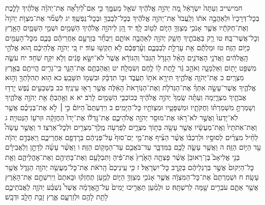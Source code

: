 \documentclass[twoside, openany, parskip=half, 11pt]{book}
\begin{document}
חמישייב וְעַתָּה֙ יִשְׂרָאֵ֔ל מָ֚ה יְהֹוָ֣ה אֱלֹהֶ֔יךָ שֹׁאֵ֖ל מֵעִמָּ֑ךְ כִּ֣י אִם־לְ֠יִרְאָ֠ה אֶת־יְהֹוָ֨ה אֱלֹהֶ֜יךָ לָלֶ֤כֶת בְּכׇל־דְּרָכָיו֙ וּלְאַהֲבָ֣ה אֹת֔וֹ וְלַֽעֲבֹד֙ אֶת־יְהֹוָ֣ה אֱלֹהֶ֔יךָ בְּכׇל־לְבָבְךָ֖ וּבְכׇל־נַפְשֶֽׁךָ׃ יג לִשְׁמֹ֞ר אֶת־מִצְוֺ֤ת יְהֹוָה֙ וְאֶת־חֻקֹּתָ֔יו אֲשֶׁ֛ר אָנֹכִ֥י מְצַוְּךָ֖ הַיּ֑וֹם לְט֖וֹב לָֽךְ׃ יד הֵ֚ן לַיהֹוָ֣ה אֱלֹהֶ֔יךָ הַשָּׁמַ֖יִם וּשְׁמֵ֣י הַשָּׁמָ֑יִם הָאָ֖רֶץ וְכׇל־אֲשֶׁר־בָּֽהּ׃ טו רַ֧ק בַּאֲבֹתֶ֛יךָ חָשַׁ֥ק יְהֹוָ֖ה לְאַהֲבָ֣ה אוֹתָ֑ם וַיִּבְחַ֞ר בְּזַרְעָ֣ם אַחֲרֵיהֶ֗ם בָּכֶ֛ם מִכׇּל־הָעַמִּ֖ים כַּיּ֥וֹם הַזֶּֽה׃ טז וּמַלְתֶּ֕ם אֵ֖ת עׇרְלַ֣ת לְבַבְכֶ֑ם וְעׇ֨רְפְּכֶ֔ם לֹ֥א תַקְשׁ֖וּ עֽוֹד׃ יז כִּ֚י יְהֹוָ֣ה אֱלֹֽהֵיכֶ֔ם ה֚וּא אֱלֹהֵ֣י הָֽאֱלֹהִ֔ים וַאֲדֹנֵ֖י הָאֲדֹנִ֑ים הָאֵ֨ל הַגָּדֹ֤ל הַגִּבֹּר֙ וְהַנּוֹרָ֔א אֲשֶׁר֙ לֹא־יִשָּׂ֣א פָנִ֔ים וְלֹ֥א יִקַּ֖ח שֹֽׁחַד׃ יח עֹשֶׂ֛ה מִשְׁפַּ֥ט יָת֖וֹם וְאַלְמָנָ֑ה וְאֹהֵ֣ב גֵּ֔ר לָ֥תֶת ל֖וֹ לֶ֥חֶם וְשִׂמְלָֽה׃ יט וַאֲהַבְתֶּ֖ם אֶת־הַגֵּ֑ר כִּֽי־גֵרִ֥ים הֱיִיתֶ֖ם בְּאֶ֥רֶץ מִצְרָֽיִם׃ כ אֶת־יְהֹוָ֧ה אֱלֹהֶ֛יךָ תִּירָ֖א אֹת֣וֹ תַעֲבֹ֑ד וּב֣וֹ תִדְבָּ֔ק וּבִשְׁמ֖וֹ תִּשָּׁבֵֽעַ׃ כא ה֥וּא תְהִלָּתְךָ֖ וְה֣וּא אֱלֹהֶ֑יךָ אֲשֶׁר־עָשָׂ֣ה אִתְּךָ֗ אֶת־הַגְּדֹלֹ֤ת וְאֶת־הַנּֽוֹרָאֹת֙ הָאֵ֔לֶּה אֲשֶׁ֥ר רָא֖וּ עֵינֶֽיךָ׃ כב בְּשִׁבְעִ֣ים נֶ֔פֶשׁ יָרְד֥וּ אֲבֹתֶ֖יךָ מִצְרָ֑יְמָה וְעַתָּ֗ה שָֽׂמְךָ֙ יְהֹוָ֣ה אֱלֹהֶ֔יךָ כְּכוֹכְבֵ֥י הַשָּׁמַ֖יִם לָרֹֽב׃ יא א וְאָ֣הַבְתָּ֔ אֵ֖ת יְהֹוָ֣ה אֱלֹהֶ֑יךָ וְשָׁמַרְתָּ֣ מִשְׁמַרְתּ֗וֹ וְחֻקֹּתָ֧יו וּמִשְׁפָּטָ֛יו וּמִצְוֺתָ֖יו כׇּל־הַיָּמִֽים׃ ב וִֽידַעְתֶּם֮ הַיּוֹם֒ כִּ֣י ׀ לֹ֣א אֶת־בְּנֵיכֶ֗ם אֲשֶׁ֤ר לֹֽא־יָדְעוּ֙ וַאֲשֶׁ֣ר לֹא־רָא֔וּ אֶת־מוּסַ֖ר יְהֹוָ֣ה אֱלֹהֵיכֶ֑ם אֶת־גׇּדְל֕וֹ אֶת־יָדוֹ֙ הַחֲזָקָ֔ה וּזְרֹע֖וֹ הַנְּטוּיָֽה׃ ג וְאֶת־אֹֽתֹתָיו֙ וְאֶֽת־מַעֲשָׂ֔יו אֲשֶׁ֥ר עָשָׂ֖ה בְּת֣וֹךְ מִצְרָ֑יִם לְפַרְעֹ֥ה מֶֽלֶךְ־מִצְרַ֖יִם וּלְכׇל־אַרְצֽוֹ׃ ד וַאֲשֶׁ֣ר עָשָׂה֩ לְחֵ֨יל מִצְרַ֜יִם לְסוּסָ֣יו וּלְרִכְבּ֗וֹ אֲשֶׁ֨ר הֵצִ֜יף אֶת־מֵ֤י יַם־סוּף֙ עַל־פְּנֵיהֶ֔ם בְּרׇדְפָ֖ם אַחֲרֵיכֶ֑ם וַיְאַבְּדֵ֣ם יְהֹוָ֔ה עַ֖ד הַיּ֥וֹם הַזֶּֽה׃ ה וַאֲשֶׁ֥ר עָשָׂ֛ה לָכֶ֖ם בַּמִּדְבָּ֑ר עַד־בֹּאֲכֶ֖ם עַד־הַמָּק֥וֹם הַזֶּֽה׃ ו וַאֲשֶׁ֨ר עָשָׂ֜ה לְדָתָ֣ן וְלַאֲבִירָ֗ם בְּנֵ֣י אֱלִיאָב֮ בֶּן־רְאוּבֵן֒ אֲשֶׁ֨ר פָּצְתָ֤ה הָאָ֙רֶץ֙ אֶת־פִּ֔יהָ וַתִּבְלָעֵ֥ם וְאֶת־בָּתֵּיהֶ֖ם וְאֶת־אׇהֳלֵיהֶ֑ם וְאֵ֤ת כׇּל־הַיְקוּם֙ אֲשֶׁ֣ר בְּרַגְלֵיהֶ֔ם בְּקֶ֖רֶב כׇּל־יִשְׂרָאֵֽל׃ ז כִּ֤י עֵֽינֵיכֶם֙ הָֽרֹאֹ֔ת אֶת־כׇּל־מַעֲשֵׂ֥ה יְהֹוָ֖ה הַגָּדֹ֑ל אֲשֶׁ֖ר עָשָֽׂה׃ ח וּשְׁמַרְתֶּם֙ אֶת־כׇּל־הַמִּצְוָ֔ה אֲשֶׁ֛ר אָנֹכִ֥י מְצַוְּךָ֖ הַיּ֑וֹם לְמַ֣עַן תֶּחֶזְק֗וּ וּבָאתֶם֙ וִֽירִשְׁתֶּ֣ם אֶת־הָאָ֔רֶץ אֲשֶׁ֥ר אַתֶּ֛ם עֹבְרִ֥ים שָׁ֖מָּה לְרִשְׁתָּֽהּ׃ ט וּלְמַ֨עַן תַּאֲרִ֤יכוּ יָמִים֙ עַל־הָ֣אֲדָמָ֔ה אֲשֶׁר֩ נִשְׁבַּ֨ע יְהֹוָ֧ה לַאֲבֹתֵיכֶ֛ם לָתֵ֥ת לָהֶ֖ם וּלְזַרְעָ֑ם אֶ֛רֶץ זָבַ֥ת חָלָ֖ב וּדְבָֽשׁ׃
\end{document}
